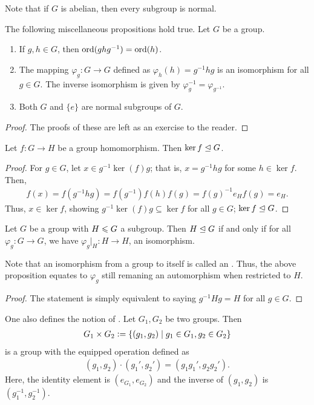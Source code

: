 Note that if $G$ is abelian, then every subgroup is normal.

\begin{proposition}
    The following miscellaneous propositions hold true. Let $G$ be a group.
    \begin{enumerate}
        \item If $g,h \in G$, then $\operatorname{ord}(ghg^{-1}) = \operatorname{ord}(h)$.
        \item The mapping $\varphi_{g}:G \to G$ defined as $\varphi_{h}(h) = g^{-1}hg$ is an isomorphism for all $g \in G$. The inverse isomorphism is given by $\varphi_{g}^{-1} = \varphi_{g^{-1}}$.
        \item Both $G$ and $\{e\}$ are normal subgroups of $G$.
    \end{enumerate}
\end{proposition}
\begin{proof}
    The proofs of these are left as an exercise to the reader.
\end{proof}

\begin{proposition}
    Let $f:G \to H$ be a group homomorphism. Then $\ker f \trianglelefteq G$.
\end{proposition}
\begin{proof}
    For $g \in G$, let $x \in g^{-1} \ker(f) g$; that is, $x = g^{-1}hg$ for some $h \in \ker f$. Then,
    \begin{align}
        f(x) = f(g^{-1}hg) = f(g^{-1})f(h)f(g) = f(g)^{-1}e_{H}f(g) = e_{H}.
    \end{align}
    Thus, $x \in \ker f$, showing $g^{-1} \ker(f) g \subseteq \ker f$ for all $g \in G$; $\ker f \trianglelefteq G$.
\end{proof}

\begin{proposition}
    Let $G$ be a group with $H \leqslant G$ a subgroup. Then $H \trianglelefteq G$ if and only if for all $\varphi_{g}:G \to G$, we have $\varphi_{g}|_{H}:H \to H$, an isomorphism.
\end{proposition}
Note that an isomorphism from a group to itself is called an . Thus, the above proposition equates to $\varphi_{g}$ still remaning an automorphism when restricted to $H$.
\begin{proof}
    The statement is simply equivalent to saying $g^{-1}Hg = H$ for all $g \in G$.
\end{proof}

One also defines the notion of . Let $G_{1},G_{2}$ be two groups. Then
\begin{align}
    G_{1} \times G_{2} \vcentcolon= \{ (g_{1},g_{2}) \mid g_{1} \in G_{1}, g_{2} \in G_{2} \}
\end{align}
is a group with the equipped operation defined as
\begin{align}
    (g_{1},g_{2}) \cdot (g_{1}',g_{2}') = (g_{1}g_{1}',g_{2}g_{2}').
\end{align}
Here, the identity element is $(e_{G_{1}},e_{G_{2}})$ and the inverse of $(g_{1},g_{2})$ is $(g_{1}^{-1},g_{2}^{-1})$.

